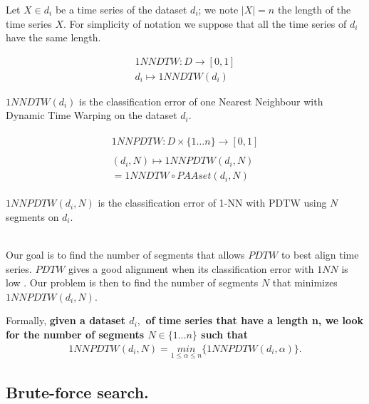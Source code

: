 Let $X \in d_i$ be a time series of the dataset $d_i$; we note $|X| = n$ the length of the time series $X$. For simplicity of notation we suppose that all the time series of $d_i$ have the same length.

\begin{definition}
\begin{eqnarray}
 1NNDTW: D \rightarrow [0, 1] \\
  d_i\mapsto 1NNDTW(d_i)
\end{eqnarray}


 $1NNDTW(d_i)$ is the classification error of one Nearest Neighbour with Dynamic Time Warping on the dataset $d_i$.
\end{definition}




\begin{definition}
\begin{eqnarray}
\begin{array}{l}
 1NNPDTW: D\times\{1 \ldots n\}\rightarrow [0, 1]\\
 \\
(d_i, N)\mapsto 1NNPDTW(d_i, N) \\
 =  1NNDTW \circ PAAset ( d_i, N) 
\end{array}
\end{eqnarray}
\end{definition}

$1NNPDTW( d_i, N)$  is the classification error of 1-NN with PDTW using $N$ segments on 
 $d_i$.

\\
Our goal is to find the number of segments that allows $PDTW$ to best align
time series.  $PDTW$ gives a good alignment when its
classification error with $1NN$ is low
\cite{Rakthanmanon_Campana_Mueen_Batista_Westover_Zhu_Zakaria_Keogh_2012}.  Our
problem is then to find the number of segments $N$ that minimizes $1NNPDTW(d_i,
N)$.

Formally, \textbf{ given a dataset $d_i,$ of time series that have a length n, we look for the number
of segments $N \in \{1 \ldots n \}$ such that}
\begin{eqnarray}
1NNPDTW(d_{i},N)=\underset{1\leq\alpha\leq n}{min}\{1NNPDTW(d_i,\alpha)\}.
\end{eqnarray}


\subsection{Brute-force search.}

